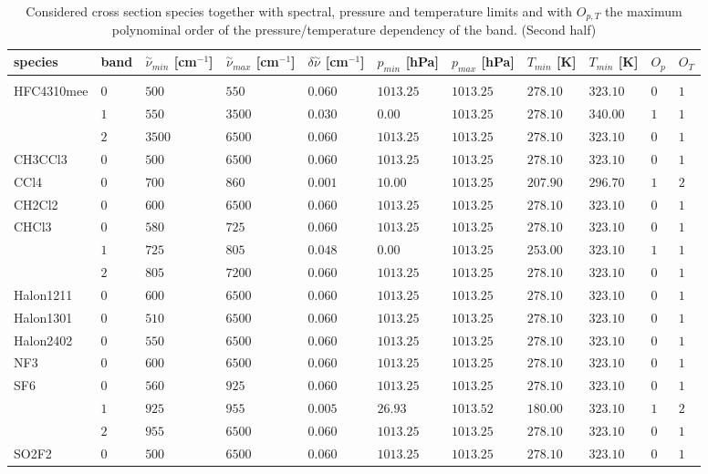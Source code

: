 \begin{table}
  \caption{Considered cross section species together
  with spectral, pressure and temperature limits and with $O_{p,T}$
  the maximum polynominal order of the pressure/temperature dependency
  of the band. (Second half)}
\label{tab:abs_theory:Xsec_Absorption-species2}
\scriptsize
\renewcommand{\arraystretch}{0.7}
\hspace{-2cm}
\begin{tabular}{lllllllllll}
\hline 
species & band & $\overset{\sim}{\nu}_{min}$ {[}cm$^{-1}${]} & $\overset{\sim}{\nu}_{max}$ {[}cm$^{-1}${]} & $\delta\overset{\sim}{\nu}$ {[}cm$^{-1}${]} & $p_{min}$ {[}hPa{]} & $p_{max}$ {[}hPa{]} & $T_{min}$ {[}K{]} & $T_{min}$ {[}K{]} & $O_{p}$ & $O_{T}$\tabularnewline
\hline 
&  &  &  &  &  &  &  &  &  & \tabularnewline
HFC4310mee & $0$ & $500$ & $550$ & $0.060$ & $1013.25$ & $1013.25$ & $278.10$ & $323.10$ & $0$ & $1$\tabularnewline
& $1$ & $550$ & $3500$ & $0.030$ & $0.00$ & $1013.25$ & $278.10$ & $340.00$ & $1$ & $1$\tabularnewline
& $2$ & $3500$ & $6500$ & $0.060$ & $1013.25$ & $1013.25$ & $278.10$ & $323.10$ & $0$ & $1$\tabularnewline
CH3CCl3 & $0$ & $500$ & $6500$ & $0.060$ & $1013.25$ & $1013.25$ & $278.10$ & $323.10$ & $0$ & $1$\tabularnewline
CCl4 & $0$ & $700$ & $860$ & $0.001$ & $10.00$ & $1013.25$ & $207.90$ & $296.70$ & $1$ & $2$\tabularnewline
CH2Cl2 & $0$ & $600$ & $6500$ & $0.060$ & $1013.25$ & $1013.25$ & $278.10$ & $323.10$ & $0$ & $1$\tabularnewline
CHCl3 & $0$ & $580$ & $725$ & $0.060$ & $1013.25$ & $1013.25$ & $278.10$ & $323.10$ & $0$ & $1$\tabularnewline
& $1$ & $725$ & $805$ & $0.048$ & $0.00$ & $1013.25$ & $253.00$ & $323.10$ & $1$ & $1$\tabularnewline
& $2$ & $805$ & $7200$ & $0.060$ & $1013.25$ & $1013.25$ & $278.10$ & $323.10$ & $0$ & $1$\tabularnewline
Halon1211 & $0$ & $600$ & $6500$ & $0.060$ & $1013.25$ & $1013.25$ & $278.10$ & $323.10$ & $0$ & $1$\tabularnewline
Halon1301 & $0$ & $510$ & $6500$ & $0.060$ & $1013.25$ & $1013.25$ & $278.10$ & $323.10$ & $0$ & $1$\tabularnewline
Halon2402 & $0$ & $550$ & $6500$ & $0.060$ & $1013.25$ & $1013.25$ & $278.10$ & $323.10$ & $0$ & $1$\tabularnewline
NF3 & $0$ & $600$ & $6500$ & $0.060$ & $1013.25$ & $1013.25$ & $278.10$ & $323.10$ & $0$ & $1$\tabularnewline
SF6 & $0$ & $560$ & $925$ & $0.060$ & $1013.25$ & $1013.25$ & $278.10$ & $323.10$ & $0$ & $1$\tabularnewline
& $1$ & $925$ & $955$ & $0.005$ & $26.93$ & $1013.52$ & $180.00$ & $323.10$ & $1$ & $2$\tabularnewline
& $2$ & $955$ & $6500$ & $0.060$ & $1013.25$ & $1013.25$ & $278.10$ & $323.10$ & $0$ & $1$\tabularnewline
SO2F2 & $0$ & $500$ & $6500$ & $0.060$ & $1013.25$ & $1013.25$ & $278.10$ & $323.10$ & $0$ & $1$\tabularnewline

\end{tabular}
\end{table}
